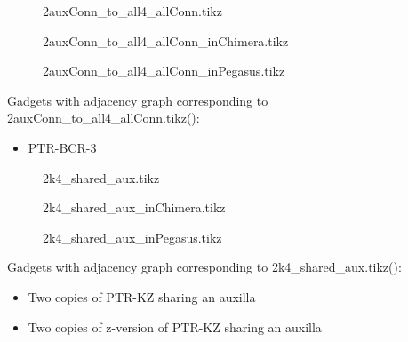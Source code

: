 \documentclass{article}
\begin{document}
\begin{figure}

\caption{2auxConn\_to\_all4\_allConn.tikz}
\end{figure}

\begin{figure}

\caption{2auxConn\_to\_all4\_allConn\_inChimera.tikz}
\end{figure}

\begin{figure}

\caption{2auxConn\_to\_all4\_allConn\_inPegasus.tikz}
\end{figure}

Gadgets with adjacency graph corresponding to 2auxConn\_to\_all4\_allConn.tikz(\scalebox{.25}{}):

\begin{itemize}
\item PTR-BCR-3
\end{itemize}

\begin{figure}

\caption{2k4\_shared\_aux.tikz}
\end{figure}

\begin{figure}

\caption{2k4\_shared\_aux\_inChimera.tikz}
\end{figure}

\begin{figure}

\caption{2k4\_shared\_aux\_inPegasus.tikz}
\end{figure}

Gadgets with adjacency graph corresponding to 2k4\_shared\_aux.tikz(\scalebox{.25}{}):

\begin{itemize}
\item Two copies of PTR-KZ sharing an auxilla
\item Two copies of z-version of PTR-KZ sharing an auxilla
\end{itemize}
\end{document}
